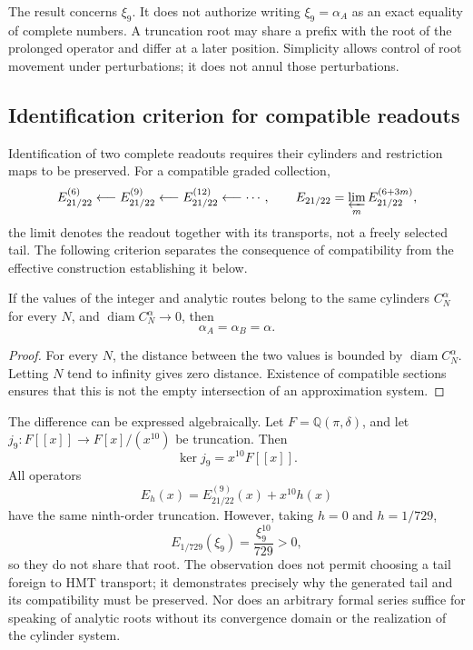 The result concerns \(\xi_9\). It does not authorize writing
\(\xi_9=\alpha_A\) as an exact equality of complete numbers.
A truncation root may share a prefix with the root of the
prolonged operator and differ at a later position. Simplicity
allows control of root movement under perturbations; it does not
annul those perturbations.

\subsection{Identification criterion for compatible readouts}
\label{subsec:alpha-limite-dos-vias}

Identification of two complete readouts requires their cylinders and
restriction maps to be preserved. For a compatible graded collection,
\[
 E_{21/22}^{(6)}\longleftarrow E_{21/22}^{(9)}
 \longleftarrow E_{21/22}^{(12)}\longleftarrow\cdots,
 \qquad
 E_{21/22}=\varprojlim_m E_{21/22}^{(6+3m)},
\]
the limit denotes the readout together with its transports, not a freely
selected tail. The following criterion separates the consequence of
compatibility from the effective construction establishing it below.

\begin{proposition}
\label{prop:alpha-dos-limites}
If the values of the integer and analytic routes belong to the
same cylinders \(C_N^\alpha\) for every \(N\), and
\(\operatorname{diam}C_N^\alpha\to0\), then
\[
 \alpha_A=\alpha_B=\alpha.
\]
\end{proposition}

\begin{proof}
For every \(N\), the distance between the two values is bounded
by \(\operatorname{diam}C_N^\alpha\). Letting \(N\) tend to infinity
gives zero distance. Existence of compatible sections ensures
that this is not the empty intersection of an approximation system.
\end{proof}

The difference can be expressed algebraically. Let
\(F=\mathbb Q(\pi,\delta)\), and let
\(j_9:F[[x]]\to F[x]/(x^{10})\) be truncation. Then
\[
 \ker j_9=x^{10}F[[x]].
\]
All operators
\[
 E_h(x)=E_{21/22}^{(9)}(x)+x^{10}h(x)
\]
have the same ninth-order truncation. However, taking
\(h=0\) and \(h=1/729\),
\[
 E_{1/729}(\xi_9)=\frac{\xi_9^{10}}{729}>0,
\]
so they do not share that root. The observation does not permit choosing a
tail foreign to HMT transport; it demonstrates precisely why the generated
tail and its compatibility must be preserved. Nor does an arbitrary formal
series suffice for speaking of analytic roots without its convergence
domain or the realization of the cylinder system.



